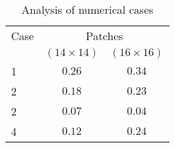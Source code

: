 \begin{table}[ht!]
	\centering
	\caption{Analysis of numerical cases}
	\label{tab:table_all_numerical_cases_bounding_boxes}
	{
		\begin{tabular}{lcc}
			\toprule
			Case & \multicolumn{2}{c}{Patches} \\ 
			\cmidrule(lr){2-3} & \multicolumn{1}{c}{\((14\times14)\)} & \multicolumn{1}{c}{\((16\times16)\)} \\			
			\midrule 
			1 & \(0.26\) & \(0.34\) \\
			2 & \(0.18\) & \(0.23\) \\
			2 & \(0.07\) & \(0.04\) \\
			4 & \(0.12\) & \(0.24\) \\
			\bottomrule
		\end{tabular}
	}
\end{table}
